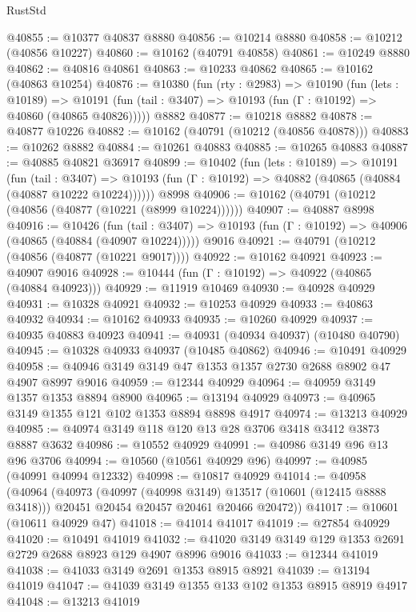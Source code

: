 \begin{lexlean}{RustStd}
\begin{coremodule}
@40855 := @10377 @40837 @8880
@40856 := @10214 @8880
@40858 := @10212 (@40856 @10227)
@40860 := @10162 (@40791 @40858)
@40861 := @10249 @8880
@40862 := @40816 @40861
@40863 := @10233 @40862
@40865 := @10162 (@40863 @10254)
@40876 := @10380
    (fun (rty : @2983) =>
    @10190
      (fun (lets : @10189) =>
      @10191 (fun (tail : @3407) => @10193 (fun (Γ : @10192) => @40860 (@40865 @40826)))))
    @8882
@40877 := @10218 @8882
@40878 := @40877 @10226
@40882 := @10162 (@40791 (@10212 (@40856 @40878)))
@40883 := @10262 @8882
@40884 := @10261 @40883
@40885 := @10265 @40883
@40887 := @40885 @40821 @36917
@40899 := @10402
    (fun (lets : @10189) =>
    @10191
      (fun (tail : @3407) =>
      @10193 (fun (Γ : @10192) => @40882 (@40865 (@40884 (@40887 @10222 @10224))))))
    @8998
@40906 := @10162 (@40791 (@10212 (@40856 (@40877 (@10221 (@8999 @10224))))))
@40907 := @40887 @8998
@40916 := @10426
    (fun (tail : @3407) => @10193 (fun (Γ : @10192) => @40906 (@40865 (@40884 (@40907 @10224)))))
    @9016
@40921 := @40791 (@10212 (@40856 (@40877 (@10221 @9017))))
@40922 := @10162 @40921
@40923 := @40907 @9016
@40928 := @10444 (fun (Γ : @10192) => @40922 (@40865 (@40884 @40923)))
@40929 := @11919 @10469
@40930 := @40928 @40929
@40931 := @10328 @40921
@40932 := @10253 @40929
@40933 := @40863 @40932
@40934 := @10162 @40933
@40935 := @10260 @40929
@40937 := @40935 @40883 @40923
@40941 := @40931 (@40934 @40937) (@10480 @40790)
@40945 := @10328 @40933 @40937 (@10485 @40862)
@40946 := @10491 @40929
@40958 := @40946 @3149 @3149 @47 @1353 @1357 @2730 @2688 @8902 @47 @4907 @8997 @9016
@40959 := @12344 @40929
@40964 := @40959 @3149 @1357 @1353 @8894 @8900
@40965 := @13194 @40929
@40973 := @40965 @3149 @1355 @121 @102 @1353 @8894 @8898 @4917
@40974 := @13213 @40929
@40985 := @40974 @3149 @118 @120 @13 @28 @3706 @3418 @3412 @3873 @8887 @3632
@40986 := @10552 @40929
@40991 := @40986 @3149 @96 @13 @96 @3706
@40994 := @10560 (@10561 @40929 @96)
@40997 := @40985 (@40991 @40994 @12332)
@40998 := @10817 @40929
@41014 := @40958
    (@40964
      (@40973
        (@40997 (@40998 @3149) @13517 (@10601 (@12415 @8888 @3418)))
        @20451
        @20454
        @20457
        @20461
        @20466
        @20472))
@41017 := @10601 (@10611 @40929 @47)
@41018 := @41014 @41017
@41019 := @27854 @40929
@41020 := @10491 @41019
@41032 := @41020 @3149 @3149 @129 @1353 @2691 @2729 @2688 @8923 @129 @4907 @8996 @9016
@41033 := @12344 @41019
@41038 := @41033 @3149 @2691 @1353 @8915 @8921
@41039 := @13194 @41019
@41047 := @41039 @3149 @1355 @133 @102 @1353 @8915 @8919 @4917
@41048 := @13213 @41019

\end{coremodule}
\end{lexlean}
